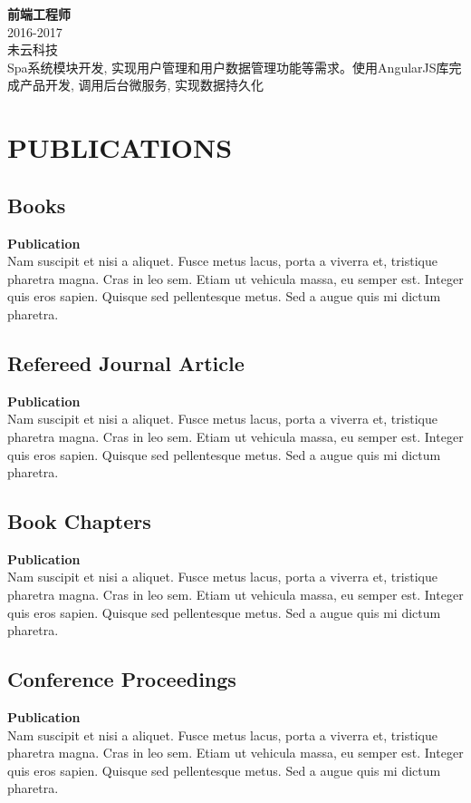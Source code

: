 \documentclass[a4paper,9pt]{extarticle}
\begin{document}
\noindent
\textbf{前端工程师} \\
2016-2017  \\
未云科技 \\ 
Spa系统模块开发, 实现用户管理和用户数据管理功能等需求。使用AngularJS库完成产品开发, 调用后台微服务, 实现数据持久化 \\


\section*{PUBLICATIONS}
 
\subsection*{Books}
\textbf{Publication} \\ 
Nam suscipit et nisi a aliquet. Fusce metus lacus, porta a viverra et, tristique pharetra magna. Cras in leo sem. Etiam ut vehicula massa, eu semper est. Integer quis eros sapien. Quisque sed pellentesque metus. Sed a augue quis mi dictum pharetra. 

\subsection*{Refereed Journal Article}
\textbf{Publication} \\ 
Nam suscipit et nisi a aliquet. Fusce metus lacus, porta a viverra et, tristique pharetra magna. Cras in leo sem. Etiam ut vehicula massa, eu semper est. Integer quis eros sapien. Quisque sed pellentesque metus. Sed a augue quis mi dictum pharetra. 

\subsection*{Book Chapters}
\textbf{Publication} \\ 
Nam suscipit et nisi a aliquet. Fusce metus lacus, porta a viverra et, tristique pharetra magna. Cras in leo sem. Etiam ut vehicula massa, eu semper est. Integer quis eros sapien. Quisque sed pellentesque metus. Sed a augue quis mi dictum pharetra. 

\subsection*{Conference Proceedings}
\textbf{Publication} \\ 
Nam suscipit et nisi a aliquet. Fusce metus lacus, porta a viverra et, tristique pharetra magna. Cras in leo sem. Etiam ut vehicula massa, eu semper est. Integer quis eros sapien. Quisque sed pellentesque metus. Sed a augue quis mi dictum pharetra. 
\end{document}
